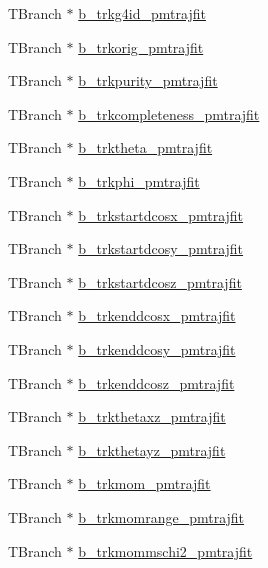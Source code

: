 \begin{DoxyCompactItemize}
\item 
T\-Branch $\ast$ \hyperlink{classanatree_acb87e1d23628ce8a738a2ac478782bac}{b\-\_\-trkg4id\-\_\-pmtrajfit}
\item 
T\-Branch $\ast$ \hyperlink{classanatree_abc1dbea56a02d085bc8c1e2784937c6f}{b\-\_\-trkorig\-\_\-pmtrajfit}
\item 
T\-Branch $\ast$ \hyperlink{classanatree_aeca569e3323d1f0a200c82db4302301a}{b\-\_\-trkpurity\-\_\-pmtrajfit}
\item 
T\-Branch $\ast$ \hyperlink{classanatree_a25104c0078466f5d0de3ffe611f2416a}{b\-\_\-trkcompleteness\-\_\-pmtrajfit}
\item 
T\-Branch $\ast$ \hyperlink{classanatree_a192cb54dc7330981fa9cc9b92e233128}{b\-\_\-trktheta\-\_\-pmtrajfit}
\item 
T\-Branch $\ast$ \hyperlink{classanatree_a9c644532570ac09958ca3a0cf821c8cd}{b\-\_\-trkphi\-\_\-pmtrajfit}
\item 
T\-Branch $\ast$ \hyperlink{classanatree_a1b8b0f1cf447561daa2a3ac193da94a0}{b\-\_\-trkstartdcosx\-\_\-pmtrajfit}
\item 
T\-Branch $\ast$ \hyperlink{classanatree_ac9fe5997b2e476a2016fed21dcabeffb}{b\-\_\-trkstartdcosy\-\_\-pmtrajfit}
\item 
T\-Branch $\ast$ \hyperlink{classanatree_afb0a74879ede6cfb80bd480cd30ffed9}{b\-\_\-trkstartdcosz\-\_\-pmtrajfit}
\item 
T\-Branch $\ast$ \hyperlink{classanatree_a3c909f9535c74f83264e80782bdf84e2}{b\-\_\-trkenddcosx\-\_\-pmtrajfit}
\item 
T\-Branch $\ast$ \hyperlink{classanatree_ae584bec2ef0b97997b87dfee09a1378e}{b\-\_\-trkenddcosy\-\_\-pmtrajfit}
\item 
T\-Branch $\ast$ \hyperlink{classanatree_a071b975050b22ffc9dff743cd188c36b}{b\-\_\-trkenddcosz\-\_\-pmtrajfit}
\item 
T\-Branch $\ast$ \hyperlink{classanatree_a9606a4cfabbb7b0adfcef803d6db1131}{b\-\_\-trkthetaxz\-\_\-pmtrajfit}
\item 
T\-Branch $\ast$ \hyperlink{classanatree_a219a796f1d82ae675f90bb95d61d9e65}{b\-\_\-trkthetayz\-\_\-pmtrajfit}
\item 
T\-Branch $\ast$ \hyperlink{classanatree_a781605818c6f79fcf0c72bb92e4afb45}{b\-\_\-trkmom\-\_\-pmtrajfit}
\item 
T\-Branch $\ast$ \hyperlink{classanatree_a430966eda9ee3cf3962961fe2bd6e1bc}{b\-\_\-trkmomrange\-\_\-pmtrajfit}
\item 
T\-Branch $\ast$ \hyperlink{classanatree_a557be6df8e770fb10e08bd2d01324af9}{b\-\_\-trkmommschi2\-\_\-pmtrajfit}

\end{DoxyCompactItemize}
